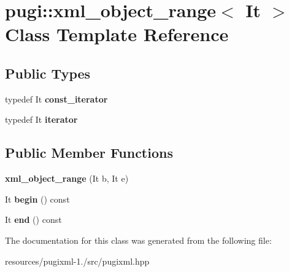 \hypertarget{classpugi_1_1xml__object__range}{\section{pugi\+:\+:xml\+\_\+object\+\_\+range$<$ It $>$ Class Template Reference}
\label{classpugi_1_1xml__object__range}
}
\subsection*{Public Types}
\begin{DoxyCompactItemize}
\item 
\hypertarget{classpugi_1_1xml__object__range_ace38fcf448c7134e13612f7ce439246c}{typedef It {\bfseries const\+\_\+iterator}}\label{classpugi_1_1xml__object__range_ace38fcf448c7134e13612f7ce439246c}

\item 
\hypertarget{classpugi_1_1xml__object__range_a024ce5292d3b9f2164c1230855fdb501}{typedef It {\bfseries iterator}}\label{classpugi_1_1xml__object__range_a024ce5292d3b9f2164c1230855fdb501}

\end{DoxyCompactItemize}
\subsection*{Public Member Functions}
\begin{DoxyCompactItemize}
\item 
\hypertarget{classpugi_1_1xml__object__range_abf214db65eac081e4478169cb03bce67}{{\bfseries xml\+\_\+object\+\_\+range} (It b, It e)}\label{classpugi_1_1xml__object__range_abf214db65eac081e4478169cb03bce67}

\item 
\hypertarget{classpugi_1_1xml__object__range_ad8d64cefea10330a0f975fbb13a99a8a}{It {\bfseries begin} () const }\label{classpugi_1_1xml__object__range_ad8d64cefea10330a0f975fbb13a99a8a}

\item 
\hypertarget{classpugi_1_1xml__object__range_ad2c9b91aca1c3d4761c767af29a9d7ff}{It {\bfseries end} () const }\label{classpugi_1_1xml__object__range_ad2c9b91aca1c3d4761c767af29a9d7ff}

\end{DoxyCompactItemize}


The documentation for this class was generated from the following file\+:\begin{DoxyCompactItemize}
\item 
resources/pugixml-\/1./src/pugixml.\+hpp\end{DoxyCompactItemize}
